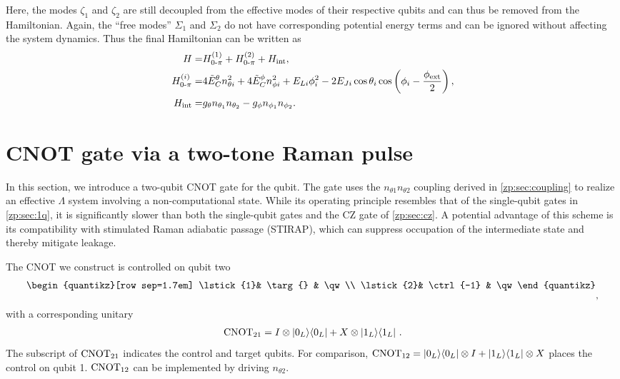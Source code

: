 \begin{widetext}
Here, the modes $\zeta_1$ and $\zeta_2$ are still decoupled from the effective modes of their respective \zps qubits and can thus be removed from the Hamiltonian.
Again, the ``free modes'' $\Sigma_1$ and $\Sigma_2$ do not have corresponding potential energy terms and can be ignored without affecting the system dynamics.
Thus the final Hamiltonian can be written as
\begin{subequations}
\begin{align}
    H =& H_{0\text{-}\pi}^{(1)} + H_{0\text{-}\pi}^{(2)} + H_{\rm int}, \\
    H_{0\text{-}\pi}^{(i)} =&  4\tilde E_C^{\theta} n_{\theta i}^2 + 4\tilde E_C^{\phi} n_{\phi i}^2   +   E_{Li}\phi_i^2 - 2E_{Ji}\cos{\theta_i}\cos\left (\phi_i - \frac{\phi_{\rm ext}}{2}\right ) , \\
    H_{\rm int} =& g_{\theta} n_{\theta_1}n_{\theta_2}
    - g_{\phi} n_{\phi_1}n_{\phi_2}.
\end{align}
\end{subequations}
\end{widetext}

\section{CNOT gate via a two-tone Raman pulse}\label{zp:sec:cnot}

In this section, we introduce a two-qubit CNOT gate for the \zps qubit.
The gate uses the $n_{\theta 1}n_{\theta 2}$ coupling derived in \cref{zp:sec:coupling} to realize an effective $\Lambda$ system involving a non-computational state.
While its operating principle resembles that of the single-qubit gates in \cref{zp:sec:1q}, it is significantly slower than both the single-qubit gates and the CZ gate of \cref{zp:sec:cz}.
A potential advantage of this scheme is its compatibility with stimulated Raman adiabatic passage (STIRAP), which can suppress occupation of the intermediate state and thereby mitigate leakage.

The CNOT we construct is controlled on qubit two
\begin{equation}
\begin{quantikz}[row sep=1.7em]
\lstick{1}& \targ{} & \qw \\
\lstick{2}& \ctrl{-1} & \qw
\end{quantikz}
\raisebox{-10pt}{,}
\end{equation}
with a corresponding unitary
\begin{align} \label{zp:eq:cnot01}
 {\rm CNOT}_{21} = I \otimes \ket{0_L}\!\bra{0_L} + X \otimes \ket{1_L}\!\bra{1_L} \, .
\end{align}
The subscript of $ {\rm CNOT}_{21}$ indicates the control and target qubits.
For comparison, ${\rm CNOT}_{12} = \ket{0_L}\!\bra{0_L} \otimes I + \ket{1_L}\!\bra{1_L} \otimes X$ places the control on qubit 1.
${\rm CNOT}_{12}$ can be implemented by driving $n_{\theta 2}$.

